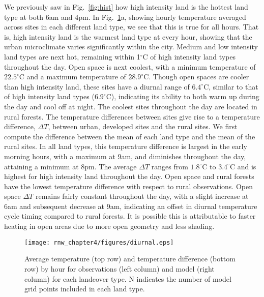 We previously saw in Fig.~\ref{fig:hist} how high intensity land is the hottest land type at both 6am and 4pm.  In Fig.~\ref{fig:diurnal}a, showing hourly temperature averaged across sites in each different land type, we see that this is true for all hours. That is, high intensity land is the warmest land type at every hour, showing that the urban microclimate varies significantly within the city. 
Medium and low intensity land types are next hot, remaining within 1$^\circ$C of high intensity land types throughout the day. Open space is next coolest, with a minimum temperature of $22.5^\circ$C and a maximum temperature of $28.9^\circ$C. 
Though open spaces are cooler than high intensity land, these sites have a diurnal range of $6.4^\circ$C, similar to that of high intensity land types ($6.9^\circ$C), indicating its ability to both warm up during the day and cool off at night. 
The coolest sites throughout the day are located in rural forests. 
The temperature differences between sites give rise to a temperature difference, $\Delta T$, between urban, developed sites and the rural sites. We first compute the difference between the mean of each land type and the mean of the rural sites. 
In all land types, this temperature difference is largest in the early morning hours, with a maximum at 9am, and diminishes throughout the day, attaining a minimum at 8pm. The average $\Delta T$ ranges from $1.8^\circ$C to $3.4^\circ$C
and is highest for high intensity land throughout the day. Open space and rural forests have the lowest temperature difference with respect to rural observations. Open space $\Delta T$ remains fairly constant throughout the day, with a slight increase at 6am and subsequent decrease at 9am, indicating an offset in diurnal temperature cycle timing compared to rural forests. It is possible this is attributable to faster heating in open areas due to more open geometry and less shading. 

\begin{figure}[h]
\centering
\texttt{[image: rnw\_chapter4/figures/diurnal.eps]}
\caption{Average temperature (top row) and temperature difference (bottom row) by hour for observations (left column) and model (right column) for each landcover type. N indicates the number of model grid points included in each land type. }
\label{fig:diurnal}
\end{figure}

